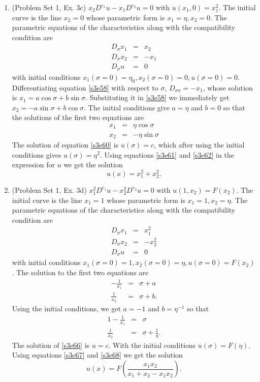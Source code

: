 \documentclass{article}
\theoremstyle{plain}
\numberwithin{thm}{section}
\theoremstyle{plain}
\numberwithin{prop}{section}
\theoremstyle{definition}
\numberwithin{defn}{section}
\theoremstyle{remark}
\numberwithin{equation}{section}
\begin{document}
\begin{enumerate}
\item (Problem Set 1, Ex. 3c) $x_2D^{e_1}u - x_1D^{e_2}u = 0$ with $u(x_1, 0) = x_1^2$. The initial
curve is the line $x_2 = 0$ whose parametric form is $x_1 = \eta, x_2 = 0$. The parametric equations
of the characteristics along with the compatibility condition are
\begin{eqnarray}
D_\sigma x_1 &=& x_2 \label{s3e58} \\
D_\sigma x_2 &=& -x_1 \label{s3e59} \\
D_\sigma u &=& 0 \label{s3e60}
\end{eqnarray}
with initial conditions $x_1(\sigma = 0) = \eta_0, x_2(\sigma = 0) = 0, u(\sigma = 0) = 0$. 
Differentiating equation \eqref{s3e58} with respect to $\sigma$, $D_{\sigma\sigma} = -x_1$, whose
solution is $x_1 = a\cos\sigma + b\sin\sigma$. Substituting it in \eqref{s3e58} we immediately get
$x_2 = -a\sin\sigma + b\cos\sigma$. The initial conditions give $a = \eta$ and $b = 0$ so that
the solutions of the first two equations are
\begin{eqnarray}
x_1 &=& \eta\cos\sigma \label{s3e61} \\
x_2 &=& -\eta\sin\sigma \label{s3e62}
\end{eqnarray}
The solution of equation \eqref{s3e60} is $u(\sigma) = c$, which after using the initial conditions
gives $u(\sigma) = \eta^2$. Using equations \eqref{s3e61} and \eqref{s3e62} in the expression for $u$
we get the solution
\begin{equation}\label{s3e63}
u(x) = x_1^2 + x_2^2.
\end{equation}

\item (Problem Set 1, Ex. 3d) $x_1^2D^{e_1}u - x_2^2D^{e_2}u = 0$ with $u(1, x_2) = F(x_2)$. The 
initial curve is the line $x_1 = 1$ whose parametric form is $x_1 = 1, x_2 = \eta$. The parametric
equations of the characteristics along with the compatibility condition are
\begin{eqnarray}
D_\sigma x_1 &=& x_1^2 \label{s3e64} \\
D_\sigma x_2 &=& -x_2^2 \label{s3e65} \\
D_\sigma u &=& 0 \label{s3e66}
\end{eqnarray}
with initial conditions $x_1(\sigma = 0) = 1, x_2(\sigma = 0) = \eta, u(\sigma = 0) = F(x_2)$. The 
solution to the first two equations are
\begin{eqnarray*}
-\frac{1}{x_1} &=& \sigma + a \\
\frac{1}{x_2} &=& \sigma + b.
\end{eqnarray*}
Using the initial conditions, we get $a = -1$ and $b = \eta^{-1}$ so that
\begin{eqnarray}
1 -\frac{1}{x_1} &=& \sigma \label{s3e67} \\
\frac{1}{x_2} &=& \sigma + \frac{1}{\eta} \label{s3e68}.
\end{eqnarray}
The solution of \eqref{s3e66} is $u = c$. With the initial conditions $u(\sigma) = F(\eta)$. Using
equations \eqref{s3e67} and \eqref{s3e68} we get the solution
\begin{equation}\label{s3e69}
u(x) = F\left(\frac{x_1x_2}{x_1 + x_2 - x_1x_2}\right).
\end{equation} 


\end{enumerate}
\end{document}
